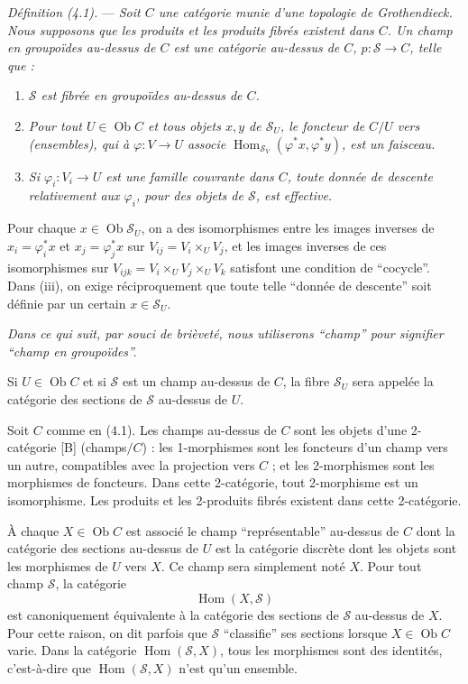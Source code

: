 \documentclass[10pt]{article}
\newcommand{\Hom}{\operatorname{Hom}}
\begin{document}
\medskip
\noindent\emph{Définition (4.1).} --- \emph{Soit $C$ une catégorie munie d'une topologie de Grothendieck. Nous supposons que les produits et les produits fibrés existent dans $C$. Un champ en groupoïdes au-dessus de $C$ est une catégorie au-dessus de $C$, $p:\mathscr S\to C$, telle que :}
\begin{enumerate}[label=(\roman*)]
\item \emph{$\mathscr S$ est fibrée en groupoïdes au-dessus de $C$.}
\item \emph{Pour tout $U\in\operatorname{Ob} C$ et tous objets $x,y$ de $\mathscr S_U$, le foncteur de $C/U$ vers (ensembles), qui à $\varphi:V\to U$ associe $\Hom_{\mathscr S_V}(\varphi^*x,\varphi^*y)$, est un faisceau.}
\item \emph{Si $\varphi_i:V_i\to U$ est une famille couvrante dans $C$, toute donnée de descente relativement aux $\varphi_i$, pour des objets de $\mathscr S$, est effective.}
\end{enumerate}

Pour chaque $x\in\operatorname{Ob}\mathscr S_U$, on a des isomorphismes entre les images inverses de $x_i=\varphi_i^*x$ et $x_j=\varphi_j^*x$ sur $V_{ij}=V_i\times_U V_j$, et les images inverses de ces isomorphismes sur $V_{ijk}=V_i\times_U V_j\times_U V_k$ satisfont une condition de ``cocycle''. Dans (iii), on exige réciproquement que toute telle ``donnée de descente'' soit définie par un certain $x\in\mathscr S_U$.

\emph{Dans ce qui suit, par souci de brièveté, nous utiliserons ``champ'' pour signifier ``champ en groupoïdes''.}

Si $U\in\operatorname{Ob} C$ et si $\mathscr S$ est un champ au-dessus de $C$, la fibre $\mathscr S_U$ sera appelée la catégorie des sections de $\mathscr S$ au-dessus de $U$.

Soit $C$ comme en (4.1). Les champs au-dessus de $C$ sont les objets d'une 2-catégorie [B] (champs$/C$) : les 1-morphismes sont les foncteurs d'un champ vers un autre, compatibles avec la projection vers $C$ ; et les 2-morphismes sont les morphismes de foncteurs. Dans cette 2-catégorie, tout 2-morphisme est un isomorphisme. Les produits et les 2-produits fibrés existent dans cette 2-catégorie.

À chaque $X\in\operatorname{Ob} C$ est associé le champ ``représentable'' au-dessus de $C$ dont la catégorie des sections au-dessus de $U$ est la catégorie discrète dont les objets sont les morphismes de $U$ vers $X$. Ce champ sera simplement noté $X$. Pour tout champ $\mathscr S$, la catégorie
\[
\Hom(X,\mathscr S)
\]
est canoniquement équivalente à la catégorie des sections de $\mathscr S$ au-dessus de $X$. Pour cette raison, on dit parfois que $\mathscr S$ ``classifie'' ses sections lorsque $X\in\operatorname{Ob} C$ varie. Dans la catégorie $\Hom(\mathscr S,X)$, tous les morphismes sont des identités, c'est-à-dire que $\Hom(\mathscr S,X)$ n'est qu'un ensemble.
\end{document}
